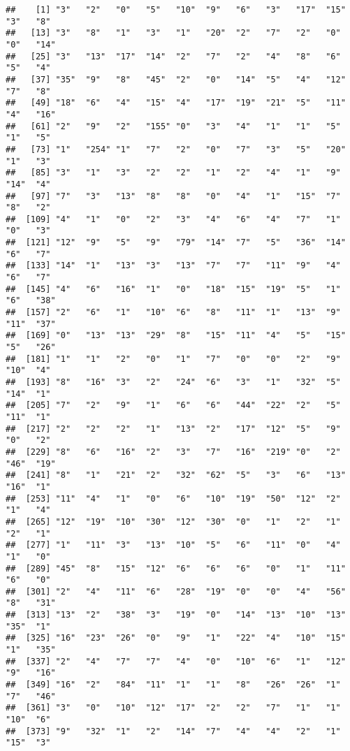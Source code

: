 \documentclass[
]{article}
\begin{document}
\begin{verbatim}
##    [1] "3"   "2"   "0"   "5"   "10"  "9"   "6"   "3"   "17"  "15"  "3"   "8"  
##   [13] "3"   "8"   "1"   "3"   "1"   "20"  "2"   "7"   "2"   "0"   "0"   "14" 
##   [25] "3"   "13"  "17"  "14"  "2"   "7"   "2"   "4"   "8"   "6"   "5"   "4"  
##   [37] "35"  "9"   "8"   "45"  "2"   "0"   "14"  "5"   "4"   "12"  "7"   "8"  
##   [49] "18"  "6"   "4"   "15"  "4"   "17"  "19"  "21"  "5"   "11"  "4"   "16" 
##   [61] "2"   "9"   "2"   "155" "0"   "3"   "4"   "1"   "1"   "5"   "1"   "5"  
##   [73] "1"   "254" "1"   "7"   "2"   "0"   "7"   "3"   "5"   "20"  "1"   "3"  
##   [85] "3"   "1"   "3"   "2"   "2"   "1"   "2"   "4"   "1"   "9"   "14"  "4"  
##   [97] "7"   "3"   "13"  "8"   "8"   "0"   "4"   "1"   "15"  "7"   "8"   "2"  
##  [109] "4"   "1"   "0"   "2"   "3"   "4"   "6"   "4"   "7"   "1"   "0"   "3"  
##  [121] "12"  "9"   "5"   "9"   "79"  "14"  "7"   "5"   "36"  "14"  "6"   "7"  
##  [133] "14"  "1"   "13"  "3"   "13"  "7"   "7"   "11"  "9"   "4"   "6"   "7"  
##  [145] "4"   "6"   "16"  "1"   "0"   "18"  "15"  "19"  "5"   "1"   "6"   "38" 
##  [157] "2"   "6"   "1"   "10"  "6"   "8"   "11"  "1"   "13"  "9"   "11"  "37" 
##  [169] "0"   "13"  "13"  "29"  "8"   "15"  "11"  "4"   "5"   "15"  "5"   "26" 
##  [181] "1"   "1"   "2"   "0"   "1"   "7"   "0"   "0"   "2"   "9"   "10"  "4"  
##  [193] "8"   "16"  "3"   "2"   "24"  "6"   "3"   "1"   "32"  "5"   "14"  "1"  
##  [205] "7"   "2"   "9"   "1"   "6"   "6"   "44"  "22"  "2"   "5"   "11"  "1"  
##  [217] "2"   "2"   "2"   "1"   "13"  "2"   "17"  "12"  "5"   "9"   "0"   "2"  
##  [229] "8"   "6"   "16"  "2"   "3"   "7"   "16"  "219" "0"   "2"   "46"  "19" 
##  [241] "8"   "1"   "21"  "2"   "32"  "62"  "5"   "3"   "6"   "13"  "16"  "1"  
##  [253] "11"  "4"   "1"   "0"   "6"   "10"  "19"  "50"  "12"  "2"   "1"   "4"  
##  [265] "12"  "19"  "10"  "30"  "12"  "30"  "0"   "1"   "2"   "1"   "2"   "1"  
##  [277] "1"   "11"  "3"   "13"  "10"  "5"   "6"   "11"  "0"   "4"   "1"   "0"  
##  [289] "45"  "8"   "15"  "12"  "6"   "6"   "6"   "0"   "1"   "11"  "6"   "0"  
##  [301] "2"   "4"   "11"  "6"   "28"  "19"  "0"   "0"   "4"   "56"  "8"   "31" 
##  [313] "13"  "2"   "38"  "3"   "19"  "0"   "14"  "13"  "10"  "13"  "35"  "1"  
##  [325] "16"  "23"  "26"  "0"   "9"   "1"   "22"  "4"   "10"  "15"  "1"   "35" 
##  [337] "2"   "4"   "7"   "7"   "4"   "0"   "10"  "6"   "1"   "12"  "9"   "16" 
##  [349] "16"  "2"   "84"  "11"  "1"   "1"   "8"   "26"  "26"  "1"   "7"   "46" 
##  [361] "3"   "0"   "10"  "12"  "17"  "2"   "2"   "7"   "1"   "1"   "10"  "6"  
##  [373] "9"   "32"  "1"   "2"   "14"  "7"   "4"   "4"   "2"   "1"   "15"  "3"  

\end{verbatim}
\end{document}

